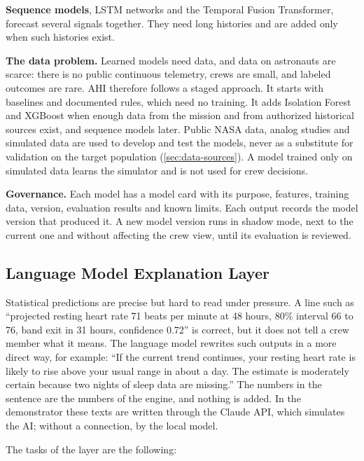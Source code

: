 \medskip\noindent\textbf{Sequence models}, LSTM networks and the Temporal Fusion Transformer, forecast several signals together. They need long histories and are added only when such histories exist.

\medskip\noindent\textbf{The data problem.} Learned models need data, and data on astronauts are scarce: there is no public continuous telemetry, crews are small, and labeled outcomes are rare. AHI therefore follows a staged approach. It starts with baselines and documented rules, which need no training. It adds Isolation Forest and XGBoost when enough data from the mission and from authorized historical sources exist, and sequence models later. Public NASA data, analog studies and simulated data are used to develop and test the models, never as a substitute for validation on the target population (\ref{sec:data-sources}). A model trained only on simulated data learns the simulator and is not used for crew decisions.

\medskip\noindent\textbf{Governance.} Each model has a model card with its purpose, features, training data, version, evaluation results and known limits. Each output records the model version that produced it. A new model version runs in shadow mode, next to the current one and without affecting the crew view, until its evaluation is reviewed.

\subsection{Language Model Explanation Layer}
\label{subsec:llm-layer}

Statistical predictions are precise but hard to read under pressure. A line such as ``projected resting heart rate 71 beats per minute at 48 hours, 80\% interval 66 to 76, band exit in 31 hours, confidence 0.72'' is correct, but it does not tell a crew member what it means. The language model rewrites such outputs in a more direct way, for example: ``If the current trend continues, your resting heart rate is likely to rise above your usual range in about a day. The estimate is moderately certain because two nights of sleep data are missing.'' The numbers in the sentence are the numbers of the engine, and nothing is added. In the demonstrator these texts are written through the Claude API, which simulates the AI; without a connection, by the local model.

The tasks of the layer are the following:

